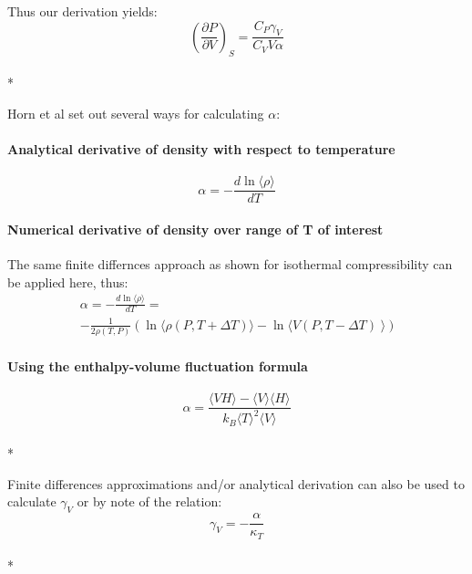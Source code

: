 \documentclass[aps,pre,nofootinbib,superscriptaddress,linenumbers,10pt, draft,tightenlines]{revtex4-1}
\begin{document}
\begin{itemize}
\begin{itemize}
        Thus our derivation yields:
        \begin{equation}\left(\frac{\partial P}{\partial V}\right)_{S} = \frac{C_P \gamma_V}{C_V V \alpha}\end{equation}\\*
        
        Horn et al set out several ways for calculating $\alpha$\cite{horn}:
        
        \paragraph{Analytical derivative of density with respect to temperature}
        \begin{equation}\alpha = -\frac{d\ln\langle \rho \rangle}{dT}\end{equation}
        
        \paragraph{Numerical derivative of density over range of T of interest}
        The same finite differnces approach as shown for isothermal compressibility can be applied here, thus:
        \begin{multline}
        \alpha = -\frac{d\ln\langle \rho \rangle}{dT} = \\ -\frac{1}{2\rho(T,P)} \left(\ln \langle \rho(P,T+\Delta T)\rangle - \ln \langle V(P,T-\Delta T)\right\rangle)\end{multline}
        \paragraph{Using the enthalpy-volume fluctuation formula}
        \begin{equation}\alpha = \frac{\langle VH \rangle - \langle V \rangle \langle H \rangle}{k_B \langle T \rangle^2 \langle V \rangle}\end{equation}\\*
        
        Finite differences approximations and/or analytical derivation can also be used to calculate $\gamma_V$ or by note of the relation:
        \begin{equation}\gamma_V = - \frac{\alpha}{\kappa_T}\end{equation}\\*
    	
        

\end{itemize}
\end{itemize}
\end{document}
